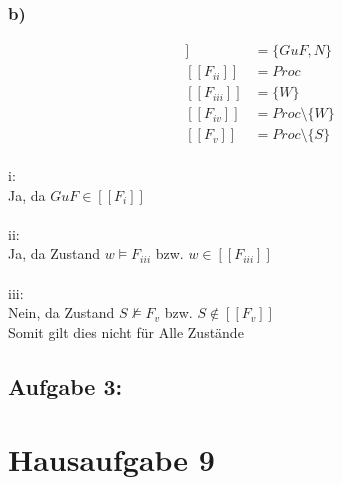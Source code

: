 \documentclass[10pt,a4paper,german,landscape,fleqn]{article} \usepackage[utf8]{inputenc} %
\newcommand{\auswf}[1]{[\![ #1 ]\!]}
\begin{document}
\subsubsection*{b)}
\begin{align*}
\auswf{F_i} &= \{GuF,N\} \\
\auswf{F_{ii}} &= Proc \\
\auswf{F_{iii}} &= \{W \} \\
\auswf{F_{iv}} &= Proc \setminus \{W\} \\
\auswf{F_{v}} &= Proc \setminus \{S\}
\end{align*}
\\
i:\\
Ja, da $GuF \in \auswf{F_i}$\\ \\
ii: \\
Ja, da Zustand $w \models F_{iii}$ bzw. $w \in \auswf{F_{iii}}$\\ \\
iii: \\
Nein, da Zustand  $S \nvDash F_v $ bzw. $S \notin \auswf{F_v} $ \\
Somit gilt dies nicht für Alle Zustände 
\newpage
\subsection*{Aufgabe 3:}


  \begin{minipage}{0.4\linewidth-7.112pt}
  \end{minipage}
\newpage
\section*{Hausaufgabe 9}
\end{document}
